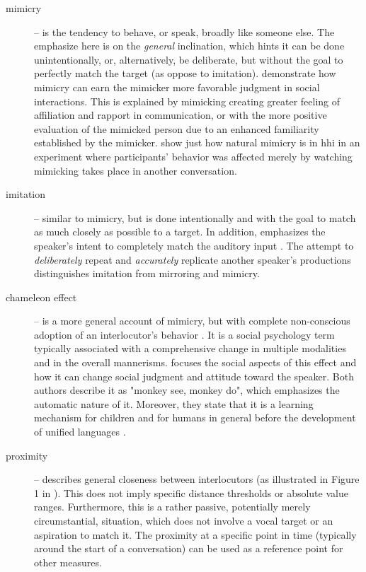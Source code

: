 \begin{description}
	\item[mimicry] -- is the tendency to behave, or speak, broadly like someone else.
	The emphasize here is on the \emph{general} inclination, which hints it can be done unintentionally, or, alternatively, be deliberate, but without the goal to perfectly match the target (as oppose to imitation).
	\citet{Gueguen2009mimicry} demonstrate how mimicry can earn the mimicker more favorable judgment in social interactions.
	This is explained by mimicking creating greater feeling of affiliation and rapport in communication, or with the more positive evaluation of the mimicked person due to an enhanced familiarity established by the mimicker.
	\citet{Parrill2006seeing} show just how natural mimicry is in \ac{hhi} in an experiment where participants' behavior was affected merely by watching mimicking takes place in another conversation.
	
	\item[imitation] -- similar to mimicry, but is done intentionally and with the goal to match as much closely as possible to a target.
	In addition, emphasizes the speaker's intent to completely match the auditory input \citep[cf.][]{Gueguen2009mimicry}.
	The attempt to \emph{deliberately} repeat and \emph{accurately} replicate another speaker's productions distinguishes imitation from mirroring and mimicry.
	
	\item[chameleon effect] -- is a more general account of mimicry, but with complete non-conscious adoption of an interlocutor's behavior \citep{Chartrand1999chameleon}.
	It is a social psychology term typically associated with a comprehensive change in multiple modalities and in the overall mannerisms.
	\citet{Gueguen2009mimicry} focuses the social aspects of this effect and how it can change social judgment and attitude toward the speaker.
	Both authors describe it as "monkey see, monkey do", which emphasizes the automatic nature of it.
	Moreover, they state that it is a learning mechanism for children and for humans in general before the development of unified languages \citet[][p.\ 256]{Gueguen2009mimicry}.
	
	\item[proximity] -- describes general closeness between interlocutors (as illustrated in Figure 1 in \citet{Levitan2011measuring}).
	This does not imply specific distance thresholds or absolute value ranges.
	Furthermore, this is a rather passive, potentially merely circumstantial, situation, which does not involve a vocal target or an aspiration to match it.
	The proximity at a specific point in time (typically around the start of a conversation) can be used as a reference point for other measures.
	

\end{description}
